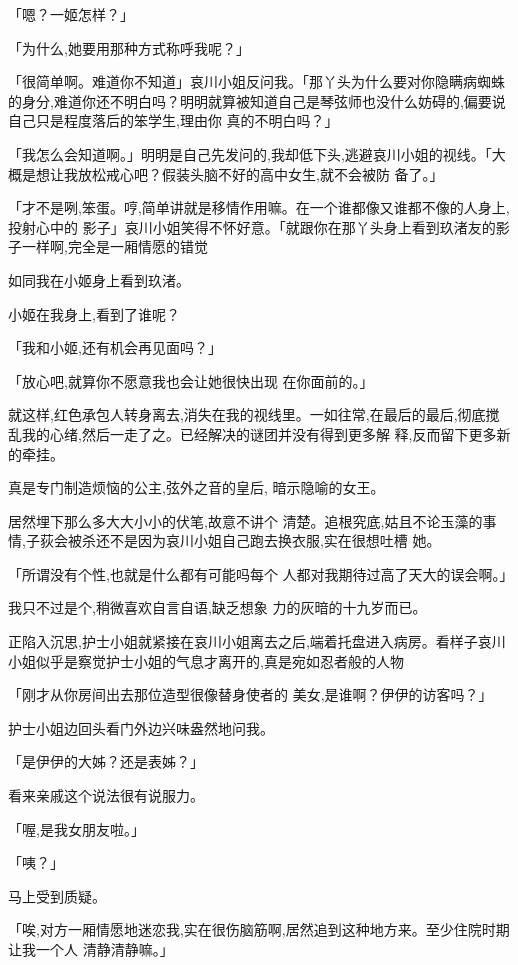 \documentclass{article}
\begin{document}
「嗯？一姬怎样？」 


「为什么,她要用那种方式称呼我呢？」 

「很简单啊。难道你不知道」哀川小姐反问我。「那丫头为什么要对你隐瞒病蜘蛛的身分,难道你还不明白吗？明明就算被知道自己是琴弦师也没什么妨碍的,偏要说自己只是程度落后的笨学生,理由你
真的不明白吗？」 

「我怎么会知道啊。」明明是自己先发问的,我却低下头,逃避哀川小姐的视线。「大概是想让我放松戒心吧？假装头脑不好的高中女生,就不会被防
备了。」 

「才不是咧,笨蛋。哼,简单讲就是移情作用嘛。在一个谁都像又谁都不像的人身上,投射心中的
\newpage
影子」哀川小姐笑得不怀好意。「就跟你在那丫头身上看到玖渚友的影子一样啊,完全是一厢情愿的错觉


如同我在小姬身上看到玖渚。 


小姬在我身上,看到了谁呢？ 


「我和小姬,还有机会再见面吗？」 

「放心吧,就算你不愿意我也会让她很快出现
在你面前的。」 

就这样,红色承包人转身离去,消失在我的视线里。一如往常,在最后的最后,彻底搅乱我的心绪,然后一走了之。已经解决的谜团并没有得到更多解
释,反而留下更多新的牵挂。 

真是专门制造烦恼的公主,弦外之音的皇后,
暗示隐喻的女王。 

居然埋下那么多大大小小的伏笔,故意不讲个
\newpage
清楚。追根究底,姑且不论玉藻的事情,子荻会被杀还不是因为哀川小姐自己跑去换衣服,实在很想吐槽
她。 

「所谓没有个性,也就是什么都有可能吗每个
人都对我期待过高了天大的误会啊。」 

我只不过是个,稍微喜欢自言自语,缺乏想象
力的灰暗的十九岁而已。 

正陷入沉思,护士小姐就紧接在哀川小姐离去之后,端着托盘进入病房。看样子哀川小姐似乎是察觉护士小姐的气息才离开的,真是宛如忍者般的人物

「刚才从你房间出去那位造型很像替身使者的
美女,是谁啊？伊伊的访客吗？」 


护士小姐边回头看门外边兴味盎然地问我。 


「是伊伊的大姊？还是表姊？」 

\newpage


看来亲戚这个说法很有说服力。 


「喔,是我女朋友啦。」 


「咦？」 


马上受到质疑。 

「唉,对方一厢情愿地迷恋我,实在很伤脑筋啊,居然追到这种地方来。至少住院时期让我一个人
清静清静嘛。」 
\end{document}
